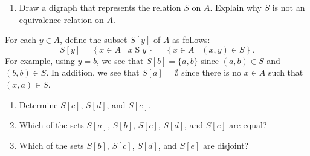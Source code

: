 \begin{previewactivity}
\setcounter{oldenumi}{\theenumi}
\begin{enumerate} \setcounter{enumi}{\theoldenumi} 
\item Draw a digraph that represents the relation  $S$  on  $A$.  Explain why  $S$  is not an equivalence relation on  $A$.
\end{enumerate}
For each $y \in A$, define the subset $S[y]$ of $A$ as follows:
\[
S[ y ] = \left\{ { {x \in A } \mid x \mathrel{S} y} \right\} = \left\{ { {x \in A } \mid \left( {x, y} \right) \in S} \right\} .
\]
For example, using $y = b$, we see that  $S[b] = \{ a, b \}$ since $(a, b) \in S$ and $(b, b) \in S$.  In addition, we see that $S[a] = \emptyset$ since there is no $x \in A$ such that $(x, a) \in S$.
\setcounter{oldenumi}{\theenumi}
\begin{enumerate} \setcounter{enumi}{\theoldenumi} 
\item Determine  $S[ c ]$, $S[ d ]$, and $S[ e ]$.
\item Which of the sets  $S[ a ]$, $S[ b ]$, $S[ c ]$, $S[ d ]$, and $S[ e ]$ are equal?
\item Which of the sets  $S[ b ]$, $S[ c ]$, $S[ d ]$, and $S[ e ]$ are disjoint?
\end{enumerate}

\end{previewactivity}
\hbreak

\endinput
